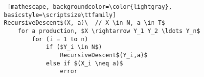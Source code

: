 \documentclass[
    border=0.2cm,
    convert={density=600}
]{standalone}
\begin{document}
\begin{lstlisting} [mathescape, backgroundcolor=\color{lightgray},
basicstyle=\scriptsize\ttfamily]
RecursiveDescent$(X, a)\  // X \in N, a \in T$
    for a production, $X \rightarrow Y_1 Y_2 \ldots Y_n$
        for (i = 1 to n)
            if ($Y_i \in N$)
                RecursiveDescent$(Y_i,a)$
            else if $(X_i \neq a)$
                error
\end{lstlisting}
\end{document}
